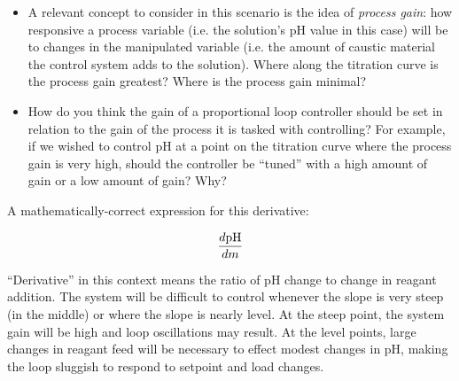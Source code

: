 \begin{itemize}
\item{} A relevant concept to consider in this scenario is the idea of {\it process gain}: how responsive a process variable (i.e. the solution's pH value in this case) will be to changes in the manipulated variable (i.e. the amount of caustic material the control system adds to the solution).  Where along the titration curve is the process gain greatest?  Where is the process gain minimal?
\item{} How do you think the gain of a proportional loop controller should be set in relation to the gain of the process it is tasked with controlling?  For example, if we wished to control pH at a point on the titration curve where the process gain is very high, should the controller be ``tuned'' with a high amount of gain or a low amount of gain?  Why?
\end{itemize}







A mathematically-correct expression for this derivative:

$${d \hbox{pH} \over dm}$$







``Derivative'' in this context means the ratio of pH change to change in reagant addition.  The system will be difficult to control whenever the slope is very steep (in the middle) or where the slope is nearly level.  At the steep point, the system gain will be high and loop oscillations may result.  At the level points, large changes in reagant feed will be necessary to effect modest changes in pH, making the loop sluggish to respond to setpoint and load changes.




